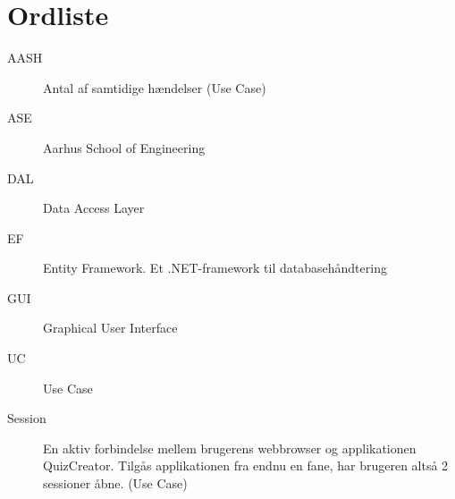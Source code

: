 \chapter{Ordliste}\label{head:ordliste}




\begin{description}
\item[AASH] Antal af samtidige hændelser (Use Case)
\item[ASE] Aarhus School of Engineering
\item[DAL] Data Access Layer
\item[EF] Entity Framework. Et .NET-framework til databasehåndtering
\item[GUI] Graphical User Interface
\item[UC] Use Case
\item[Session] En aktiv forbindelse mellem brugerens webbrowser og applikationen QuizCreator. Tilgås applikationen fra endnu en fane, har brugeren altså 2 sessioner åbne. (Use Case)

\end{description}